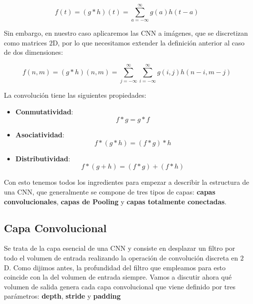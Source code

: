     \begin{equation}
        f(t)= (g \ast h)(t) = \sum_{a=-\infty}^\infty g(a) h(t-a)
    \end{equation}

    \medskip

    \noindent Sin embargo, en nuestro caso aplicaremos las CNN a imágenes, que se discretizan como matrices $2$D, por lo que necesitamos extender la definición anterior al caso de dos dimensiones: 

    \begin{equation}
        f(n,m)= (g \ast h)(n,m) = \sum_{j=-\infty}^\infty \sum_{i=-\infty}^\infty g(i,j) h(n-i,m-j)
    \end{equation}

    \noindent La convolución tiene las siguientes propiedades: 

    \begin{itemize}
        \item \textbf{Conmutatividad}: 
        \begin{equation}
            f \ast g = g \ast f
        \end{equation}
        \item \textbf{Asociatividad}: 
        \begin{equation}
            f \ast (g \ast h) = (f \ast g) \ast h
        \end{equation}
        \item \textbf{Distributividad}: 
        \begin{equation}
            f \ast (g + h)= (f\ast g) + (f \ast h)
        \end{equation}
    \end{itemize}

    \noindent Con esto tenemos todos los ingredientes para empezar a describir la estructura de una CNN, que generalmente se compone de tres tipos de capas: \textbf{capas convolucionales}, \textbf{capas de Pooling} y \textbf{capas totalmente conectadas}.

    \subsection{Capa Convolucional}
        \noindent Se trata de la capa esencial de una CNN y consiste en desplazar un filtro por todo el volumen de entrada realizando la operación de convolución discreta en $2$D. Como dijimos antes, la profundidad del filtro que empleamos para esto coincide con la del volumen de entrada siempre. Vamos a discutir ahora qué volumen de salida genera cada capa convolucional que viene definido por tres parámetros: \textbf{depth}, \textbf{stride} y \textbf{padding}


